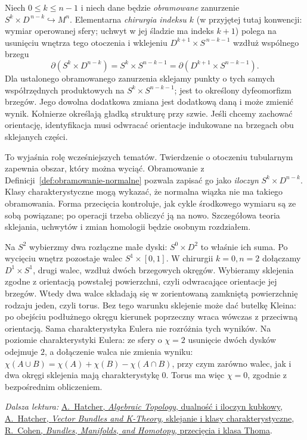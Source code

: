 \begin{definicja}
\label{def:chirurgia-zarys-16}
Niech $0\leq k\leq n-1$
i niech dane będzie
\emph{obramowane}
zanurzenie
$S^k\times D^{\,n-k}
\hookrightarrow M^n$.
Elementarna
\emph{chirurgia indeksu $k$} (w przyjętej tutaj
konwencji: wymiar operowanej sfery; uchwyt w jej
śladzie ma indeks $k+1$) polega na usunięciu
wnętrza tego
otoczenia i
wklejeniu
$D^{k+1}\times
S^{\,n-k-1}$
wzdłuż wspólnego brzegu
\[
 \partial(S^k\times D^{n-k})
 =S^k\times S^{n-k-1}
 =\partial(D^{k+1}\times S^{n-k-1}).
\]
Dla ustalonego obramowanego zanurzenia sklejamy
punkty o tych samych współrzędnych produktowych na
$S^k\times S^{n-k-1}$; jest to określony dyfeomorfizm
brzegów. Jego dowolna dodatkowa zmiana jest dodatkową
daną i może zmienić wynik. Kołnierze określają gładką
strukturę przy szwie. Jeśli chcemy zachować orientację,
identyfikacja musi odwracać orientacje indukowane
na brzegach obu sklejanych części.
\end{definicja}

To wyjaśnia rolę
wcześniejszych tematów.
Twierdzenie o otoczeniu
tubularnym zapewnia
obszar, który można
wyciąć. Obramowanie
z Definicji~\ref{def:obramowanie-normalne}
pozwala zapisać go
jako \emph{iloczyn}
$S^k\times D^{n-k}$.
Klasy charakterystyczne
mogą wykazać, że
normalna wiązka
nie ma takiego
obramowania.
Forma przecięcia
kontroluje, jak
cykle środkowego
wymiaru są ze sobą
powiązane; po
operacji trzeba
obliczyć ją na nowo.
Szczegółowa teoria
sklejania, uchwytów
i zmian homologii
będzie osobnym
rozdziałem.

\begin{przyklad}
Na $S^2$ wybierzmy
dwa rozłączne
małe dyski:
$S^0\times D^2$
to właśnie ich suma.
Po wycięciu wnętrz
pozostaje walec
$S^1\times[0,1]$.
W chirurgii
$k=0,n=2$
dołączamy
$D^1\times S^1$,
drugi walec,
wzdłuż dwóch
brzegowych okręgów.
Wybieramy sklejenia zgodne z orientacją powstałej
powierzchni, czyli odwracające orientacje jej brzegów.
Wtedy dwa walce składają się w zorientowaną zamkniętą
powierzchnię rodzaju jeden, czyli torus. Bez tego
warunku sklejenie może dać butelkę Kleina:
po obejściu podłużnego okręgu kierunek poprzeczny
wraca wówczas z przeciwną orientacją. Sama
charakterystyka Eulera nie rozróżnia tych wyników.
Na poziomie
charakterystyki
Eulera: ze sfery
o $\chi=2$ usunięcie
dwóch dysków
odejmuje $2$,
a dołączenie walca nie zmienia wyniku:
$\chi(A\cup B)=\chi(A)+\chi(B)-\chi(A\cap B)$,
przy czym zarówno walec, jak i dwa okręgi sklejenia
mają charakterystykę $0$.
Torus ma więc
$\chi=0$, zgodnie
z bezpośrednim
obliczeniem.
\end{przyklad}

\par\smallskip
{\footnotesize\noindent\emph{Dalsza lektura:}
\href{https://pi.math.cornell.edu/~hatcher/AT/AT.pdf}{A.\ Hatcher, \emph{Algebraic Topology}, dualność i iloczyn kubkowy},
\href{https://pi.math.cornell.edu/~hatcher/VBKT/VB.pdf}{A.\ Hatcher, \emph{Vector Bundles and K-Theory}, sklejanie i klasy charakterystyczne},
\href{https://math.stanford.edu/~ralph/bookR4.pdf}{R.\ Cohen, \emph{Bundles, Manifolds, and Homotopy}, przecięcia i klasa Thoma}.\par}
